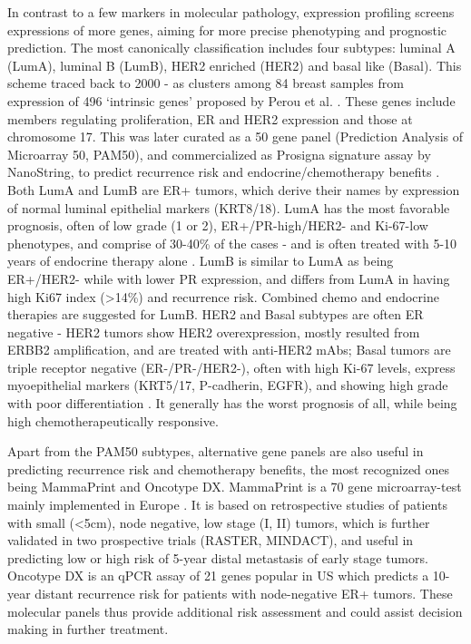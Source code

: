 In contrast to a few markers in molecular pathology, expression profiling screens expressions of more genes, aiming for more precise phenotyping and prognostic prediction. The most canonically classification includes four subtypes: luminal A (LumA), luminal B (LumB), HER2 enriched (HER2) and basal like (Basal). This scheme traced back to 2000 - as clusters among 84 breast samples from expression of 496 ‘intrinsic genes’ proposed by Perou et al. \citep{perou2000molecular}. These genes include members regulating proliferation, ER and HER2 expression and those at chromosome 17. This was later curated as a 50 gene panel (Prediction Analysis of Microarray 50, PAM50), and commercialized as Prosigna signature assay by NanoString, to predict recurrence risk and endocrine/chemotherapy benefits \citep{wallden2015development}.  Both LumA and LumB are ER+ tumors, which derive their names by expression of normal luminal epithelial markers (KRT8/18). LumA has the most favorable prognosis, often of low grade (1 or 2), ER+/PR-high/HER2- and Ki-67-low phenotypes, and comprise of 30-40\% of the cases - and is often treated with 5-10 years of endocrine therapy alone \citep{fragomeni2018molecular}. LumB is similar to LumA as being ER+/HER2- while with lower PR expression, and differs from LumA in having high Ki67 index (>14\%) and recurrence risk. Combined chemo and endocrine therapies are suggested for LumB. HER2 and Basal subtypes are often ER negative - HER2 tumors show HER2 overexpression, mostly resulted from ERBB2 amplification, and are treated with anti-HER2 mAbs; Basal tumors are triple receptor negative (ER-/PR-/HER2-), often with high Ki-67 levels, express myoepithelial markers (KRT5/17, P-cadherin, EGFR), and showing high grade with poor differentiation \citep{weigelt2010histological}. It generally has the worst prognosis of all, while being high chemotherapeutically responsive. 

Apart from the PAM50 subtypes, alternative gene panels are also useful in predicting recurrence risk and chemotherapy benefits, the most recognized ones being MammaPrint and Oncotype DX. MammaPrint is a 70 gene microarray-test mainly implemented in Europe \citep{cardoso201670}. It is based on retrospective studies of patients with small (<5cm), node negative, low stage (I, II) tumors, which is further validated in two prospective trials (RASTER, MINDACT), and useful in predicting low or high risk of 5-year distal metastasis of early stage tumors. Oncotype DX is an qPCR assay of 21 genes popular in US \citep{paik2004multigene} which predicts a 10-year distant recurrence risk for patients with node-negative ER+ tumors. These molecular panels thus provide additional risk assessment and could assist decision making in further treatment.

